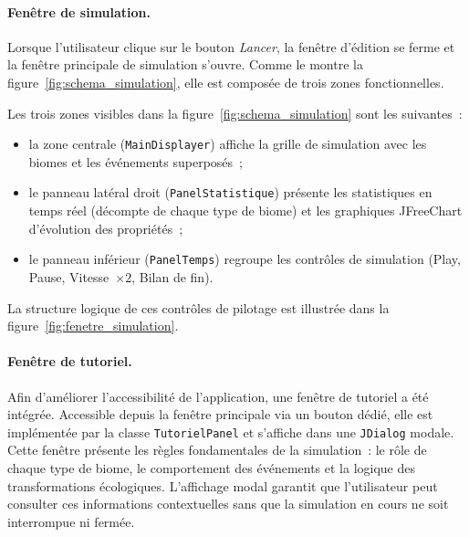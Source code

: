 \paragraph{Fenêtre de simulation.}
Lorsque l'utilisateur clique sur le bouton \textit{Lancer}, la fenêtre d'édition
se ferme et la fenêtre principale de simulation s'ouvre. Comme le montre la
figure~\ref{fig:schema_simulation}, elle est composée de trois zones
fonctionnelles.

Les trois zones visibles dans la figure~\ref{fig:schema_simulation} sont les
suivantes~:

\begin{itemize}
  \item la zone centrale (\texttt{MainDisplayer}) affiche la grille de simulation
    avec les biomes et les événements superposés~;
  \item le panneau latéral droit (\texttt{PanelStatistique}) présente les
    statistiques en temps réel (décompte de chaque type de biome) et les graphiques
    JFreeChart d'évolution des propriétés~;
  \item le panneau inférieur (\texttt{PanelTemps}) regroupe les contrôles de
    simulation (Play, Pause, Vitesse~$\times 2$, Bilan de fin).
\end{itemize}

La structure logique de ces contrôles de pilotage est illustrée dans la
figure~\ref{fig:fenetre_simulation}.

\paragraph{Fenêtre de tutoriel.}
Afin d'améliorer l'accessibilité de l'application, une fenêtre de tutoriel a été
intégrée. Accessible depuis la fenêtre principale via un bouton dédié, elle est
implémentée par la classe \texttt{TutorielPanel} et s'affiche dans une
\texttt{JDialog} modale. Cette fenêtre présente les règles fondamentales de la
simulation~: le rôle de chaque type de biome, le comportement des événements et
la logique des transformations écologiques. L'affichage modal garantit que
l'utilisateur peut consulter ces informations contextuelles sans que la simulation
en cours ne soit interrompue ni fermée.


